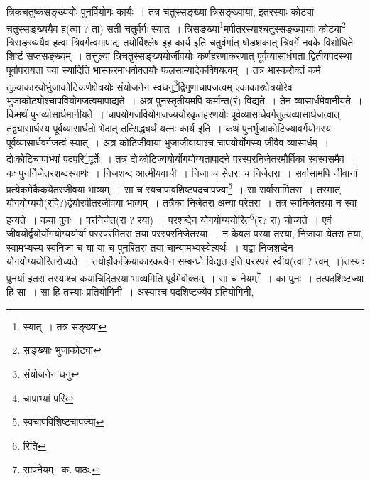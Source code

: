 \documentclass[11pt, openany]{book}
\begin{document}
\noindent त्रिकचतुष्कसङ्ख्ययोः पुनर्वियोगः कार्यः~। तत्र चतुस्सङ्ख्या त्रिसङ्ख्याया, इतरस्याः कोट्या चतुस्सङ्ख्ययैव ह(त्वा ? ता) सती चतुर्वर्गः स्यात्~। त्रिसङ्ख्या\renewcommand{\thefootnote}{१}\footnote{स्यात्~। तत्र सङ्ख्या}मपीतरस्याश्चतुस्सङ्ख्यायाः कोट्या\renewcommand{\thefootnote}{२}\footnote{सङ्ख्याः भुजाकोट्या} त्रिसङ्ख्ययैव हत्वा त्रिवर्गत्वमापाद्य तयोर्विश्लेष इह कार्य इति चतुर्वर्गात् षोडशकात् त्रिवर्गे नवके विशोधिते शिष्टं सप्तसङ्ख्यम्~। तत्तुल्या त्रिचतुस्सङ्ख्ययोर्जीवयोः कर्णहरणाकरणात् पूर्वव्यासार्धगता द्वितीयपदस्था पूर्वापरायता ज्या स्यादिति भास्करमाधवोक्तयोः फलसाम्यादेकविषयत्वम्~। तत्र भास्करोक्तं कर्म तुल्याकारयोर्भुजाकोटिकर्णक्षेत्रयोः संयोजनेन स्वधनु\renewcommand{\thefootnote}{३}\footnote{संयोजनेन धनु}र्द्विगुणाचापजत्वम् एकाकारक्षेत्रयोरेव भुजाकोट्योश्चापवियोगजत्वमापाद्यते~। अत्र पुनस्तृतीयमपि कर्मान्त(रं) विद्यते~। तेन व्यासार्धमेवानीयते~। किमर्थं पुनर्व्यासार्धमानीयते~। चापयोगजवियोगजज्ययोरकृतहरणयोः पूर्वव्यासार्धवर्गतुल्यव्यासार्धजत्वात् तद्व्यासार्धस्य पूर्वव्यासार्धतो भेदात् तत्सिद्ध्यर्थं यत्नः कार्य इति~। कथं पुनर्भुजाकोटिज्यावर्गयोगस्य पूर्वव्यासार्धवर्गजत्वं स्यात्~। अत्र कोटिजीवाया भुजाजीवायाश्च चापयोर्योगस्य जीवैव व्यासार्धम्~। दोःकोटिचापाभ्यां पदपरि\renewcommand{\thefootnote}{४}\footnote{चापाभ्यां परि}पूर्तेः~। तत्र दोःकोटिज्ययोर्योगयोग्यतापादने परस्परनिजेतरमौर्विका स्वस्वसमैव~। कः पुनर्निजेतरशब्दस्यार्थः~। निजशब्द आत्मीयवाची~। निजा च सेतरा च निजेतरा~। सर्वासामपि जीवानां प्रत्येकमेकैकयेतरजीवया भाव्यम्~। सा च स्वचापावशिष्टपदचापज्या\renewcommand{\thefootnote}{५}\footnote{स्वचापविशिष्टचापज्या}~। सा सर्वासामितरा~। तस्मात् योगयोग्ययो(रपि?)र्द्वयोरपीतरजीवया भाव्यम्~। तत्रैका निजेतरा अन्या परेतरा~। तत्र स्वनिजेतरया न स्वा हन्यते~। कया पुनः~। परनिजेत(रा ? रया)~। परशब्देन योगयोग्ययोरित\renewcommand{\thefootnote}{६}\footnote{रिति}(र? रा) चोच्यते~। एवं जीवयोर्द्वयोर्योगयोग्ययोर्या परस्परमितरा तया परस्परनिजेतरया~। न केवलं परया तस्या, निजाया येतरा तया, स्वामभ्यस्य स्वनिजा च या या च पुनरितरा तया चान्यामभ्यस्येत्यर्थः~। यद्वा निजशब्देन योगयोग्ययोरितरोच्यते~। तयोर्ह्येकक्रियाकारकत्वेन सम्बन्धो विद्यत इति परस्परं स्वीय(त्वा ? त्वम्~।)तस्याः पुनर्या इतरा तस्याश्च कयाचिदितरया भाव्यमिति पूर्वमेवोक्तम्~। सा च नेयम्\renewcommand{\thefootnote}{७}\footnote{सापनेयम् \textendash\ क. पाठः.}~। का पुनः~। तत्पदशिष्टज्या हि सा~। सा हि तस्याः प्रतियोगिनी~। अस्याश्च पदशिष्टज्यैव प्रतियोगिनी, 

\newpage
\end{document}
